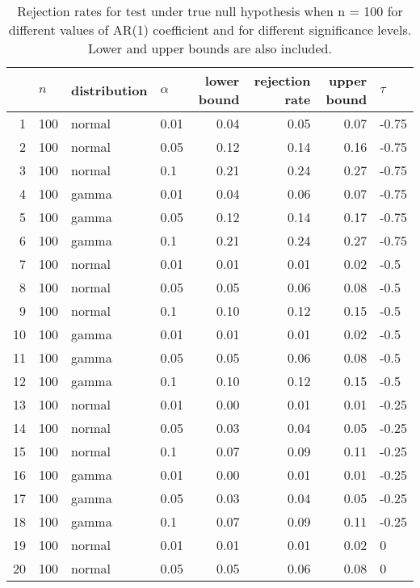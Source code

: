 \begin{table}[ht]
\centering
\caption{Rejection rates for test under true null hypothesis
                   when n = 100 for 
                   different values of AR(1) coefficient and for different 
                   significance levels. Lower and upper bounds are also 
                   included.} 
\label{table:rr_100}
\begin{tabular}{rlllrrrl}
  \hline
 & $n$ & distribution & $\alpha$ & lower bound & rejection rate & upper bound & $\tau$ \\ 
  \hline
1 & 100 & normal & 0.01 & 0.04 & 0.05 & 0.07 & -0.75 \\ 
  2 & 100 & normal & 0.05 & 0.12 & 0.14 & 0.16 & -0.75 \\ 
  3 & 100 & normal & 0.1 & 0.21 & 0.24 & 0.27 & -0.75 \\ 
  4 & 100 & gamma & 0.01 & 0.04 & 0.06 & 0.07 & -0.75 \\ 
  5 & 100 & gamma & 0.05 & 0.12 & 0.14 & 0.17 & -0.75 \\ 
  6 & 100 & gamma & 0.1 & 0.21 & 0.24 & 0.27 & -0.75 \\ 
  7 & 100 & normal & 0.01 & 0.01 & 0.01 & 0.02 & -0.5 \\ 
  8 & 100 & normal & 0.05 & 0.05 & 0.06 & 0.08 & -0.5 \\ 
  9 & 100 & normal & 0.1 & 0.10 & 0.12 & 0.15 & -0.5 \\ 
  10 & 100 & gamma & 0.01 & 0.01 & 0.01 & 0.02 & -0.5 \\ 
  11 & 100 & gamma & 0.05 & 0.05 & 0.06 & 0.08 & -0.5 \\ 
  12 & 100 & gamma & 0.1 & 0.10 & 0.12 & 0.15 & -0.5 \\ 
  13 & 100 & normal & 0.01 & 0.00 & 0.01 & 0.01 & -0.25 \\ 
  14 & 100 & normal & 0.05 & 0.03 & 0.04 & 0.05 & -0.25 \\ 
  15 & 100 & normal & 0.1 & 0.07 & 0.09 & 0.11 & -0.25 \\ 
  16 & 100 & gamma & 0.01 & 0.00 & 0.01 & 0.01 & -0.25 \\ 
  17 & 100 & gamma & 0.05 & 0.03 & 0.04 & 0.05 & -0.25 \\ 
  18 & 100 & gamma & 0.1 & 0.07 & 0.09 & 0.11 & -0.25 \\ 
  19 & 100 & normal & 0.01 & 0.01 & 0.01 & 0.02 & 0 \\ 
  20 & 100 & normal & 0.05 & 0.05 & 0.06 & 0.08 & 0 \\ 

\end{tabular}
\end{table}
